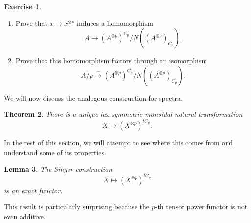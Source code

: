 \documentclass[10pt]{amsart}
\newtheorem{thm}{Theorem}[subsection]
\newtheorem{lem}[thm]{Lemma}
\theoremstyle{definition}
\newtheorem{exer}[thm]{Exercise}
\theoremstyle{remark}
\theoremstyle{plain}
\theoremstyle{definition}
\theoremstyle{remark}
\newcommand{\1}{\mathbf{1}}
\newcommand{\2}{\mathbf{2}}
\newcommand{\3}{\mathbf{3}}
\begin{document}
\begin{exer}\leavevmode
    \begin{enumerate}
        \item Prove that $x \mapsto x^{\otimes p}$ induces a homomorphism
        \[ A \to (A^{\otimes p})^{C_p}/N((A^{\otimes p})_{C_p}). \]
        \item Prove that this homomorphism factors through an isomorphism
        \[ A/p \xrightarrow{\sim} (A^{\otimes p})^{C_p}/N((A^{\otimes p})_{C_p}). \]
    \end{enumerate}
\end{exer}

We will now discuss the analogous construction for spectra.
\begin{thm}
    There is a unique lax symmetric monoidal natural transformation
    \[ X \to (X^{\otimes p})^{t C_p}. \]
\end{thm}

In the rest of this section, we will attempt to see where this comes from and understand some of its properties.

\begin{lem}
    The Singer construction
    \[ X \mapsto (X^{\otimes p})^{t C_p} \]
    is an exact functor.
\end{lem}
This result is particularly surprising because the $p$-th tensor power functor is not even additive.
\end{document}
